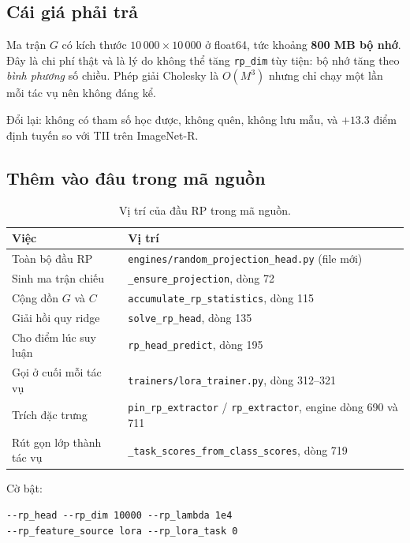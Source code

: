 \documentclass[11pt,a4paper]{article}
\begin{document}
\subsection{Cái giá phải trả}

Ma trận $G$ có kích thước $10\,000 \times 10\,000$ ở float64, tức khoảng
\textbf{800 MB bộ nhớ}. Đây là chi phí thật và là lý do không thể tăng
\texttt{rp\_dim} tùy tiện: bộ nhớ tăng theo \emph{bình phương} số chiều. Phép
giải Cholesky là $O(M^3)$ nhưng chỉ chạy một lần mỗi tác vụ nên không đáng kể.

Đổi lại: không có tham số học được, không quên, không lưu mẫu, và $+13.3$ điểm
định tuyến so với TII trên ImageNet-R.

\subsection{Thêm vào đâu trong mã nguồn}

\begin{table}[htbp]
\centering
\caption{Vị trí của đầu RP trong mã nguồn.}
\begin{tabular}{@{}p{4.4cm}>{\raggedright\arraybackslash}p{10.0cm}@{}}
\toprule
Việc & Vị trí \\
\midrule
Toàn bộ đầu RP        & \texttt{engines/random\_projection\_head.py} (file mới) \\
Sinh ma trận chiếu    & \texttt{\_ensure\_projection}, dòng 72 \\
Cộng dồn $G$ và $C$   & \texttt{accumulate\_rp\_statistics}, dòng 115 \\
Giải hồi quy ridge    & \texttt{solve\_rp\_head}, dòng 135 \\
Cho điểm lúc suy luận & \texttt{rp\_head\_predict}, dòng 195 \\
Gọi ở cuối mỗi tác vụ & \texttt{trainers/lora\_trainer.py}, dòng 312--321 \\
Trích đặc trưng       & \texttt{pin\_rp\_extractor} / \texttt{rp\_extractor},
                        engine dòng 690 và 711 \\
Rút gọn lớp thành tác vụ
                      & \texttt{\_task\_scores\_from\_class\_scores}, dòng 719 \\
\bottomrule
\end{tabular}
\end{table}

\noindent Cờ bật:

\noindent\texttt{-{}-rp\_head -{}-rp\_dim 10000 -{}-rp\_lambda 1e4}\\
\texttt{-{}-rp\_feature\_source lora -{}-rp\_lora\_task 0}
\end{document}
